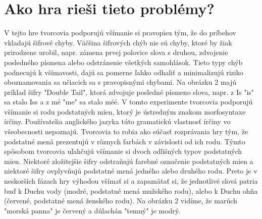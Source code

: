 \documentclass[10pt,twoside,slovak,a4paper]{article}
\begin{document}
\section{Ako hra rieši tieto problémy? }
\qquad V tejto hre tvorcovia podporujú všímanie si pravopisu tým, že do príbehov vkladajú šifrové chyby. Väčšina šifrových chýb nie sú chyby, ktoré by žiak prirodzene urobil, napr. zámena prvej polovice slova s druhou, zdvojenie posledného písmena alebo odstránenie všetkých samohlások. Tieto typy chýb podnecujú k všímavosti, dajú sa pomerne ľahko odhaliť a minimalizujú riziko oboznamovania sa učiacich sa s pravopisnými chybami. Na obrázku 2 majú príklad šifry "Double Tail", ktorá zdvojuje posledné písmeno slova, napr. z Is "is" sa stalo Iss a z mé "me" sa stalo méé.  V tomto experimente tvorcovia podporujú všímanie si rodu podstatných mien, ktorý je ústredným znakom morfosyntaxe írčiny. Používatelia anglického jazyka túto gramatickú vlastnosť írčiny vo všeobecnosti nepoznajú. Tvorcovia to robia ako súčasť rozprávania hry tým, že podstatné mená prezentujú v rôznych farbách v závislosti od ich rodu. Týmto spôsobom tvorcovia uľahčujú všímanie si dvoch odlišných typov podstatných mien. Niektoré zložitejšie šifry odstraňujú farebné označenie podstatných mien a niektoré šifry ovplyvňujú podstatné mená jedného alebo druhého rodu. Preto je v neskorších fázach hry výhodou všímať si a zapamätať si, že jednotlivé slová patria buď k Duchu vody (modré, podstatné mená mužského rodu), alebo k Duchu ohňa (červené, podstatné mená ženského rodu). Na obrázku 2 vidíme, že marúch "morská panna" je červený a dúlachán "temný" je modrý.\\
\end{document}

